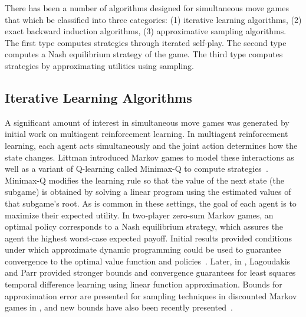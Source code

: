 There has been a number of algorithms designed for simultaneous move games that which be classified into three categories: 
(1) iterative learning algorithms, 
(2) exact backward induction algorithms, 
(3) approximative sampling algorithms.
The first type computes strategies through iterated self-play.
The second type computes a Nash equilibrium strategy of the game. 
The third type computes strategies by approximating utilities using sampling. 

\subsection{Iterative Learning Algorithms}



A significant amount of interest in simultaneous move games was generated by initial work 
on multiagent reinforcement learning. In multiagent reinforcement learning, each agent acts simultaneously and 
the joint action determines how the state changes. Littman introduced Markov games to model these interactions 
as well as a variant of Q-learning called Minimax-Q to compute strategies~\cite{Littman94markovgames,Littman01Value}.
Minimax-Q modifies the learning rule so that the value of the next state (the subgame) is obtained by solving
a linear program using the estimated values of that subgame's root.
As is common in these settings, the goal of each agent is to maximize their expected utility. 
In two-player zero-sum Markov games, an optimal policy corresponds to a Nash equilibrium strategy, which assures the agent 
the highest worst-case expected payoff. Initial results provided conditions under which approximate dynamic 
programming could be used to guarantee convergence to the optimal value function and 
policies~\cite{Littman96ageneralized}. Later, in \cite{Lagoudakis02}, Lagoudakis and Parr provided stronger bounds 
and convergence guarantees for least squares temporal difference learning using linear function approximation. 
Bounds for approximation error are presented for sampling techniques in discounted Markov games in \cite{Savagaonkar02}, 
and new bounds have also been recently presented~\cite{Perolat15Approximate}.

